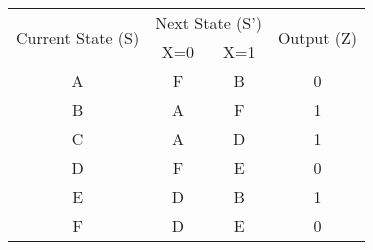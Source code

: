 \documentclass[12pt]{article}
\begin{document}
\begin{center}
    \begin{tabular}{|c|cc|c|}
        \hline
        \multirow{2}{*}{Current State (S)} & \multicolumn{2}{c|}{Next State (S')} & \multirow{2}{*}{Output (Z)}     \\ \cline{2-3}
                                           & \multicolumn{1}{c|}{X=0}             & X=1                         &   \\ \hline
        A                                  & \multicolumn{1}{c|}{F  }             & B                           & 0 \\ \hline
        B                                  & \multicolumn{1}{c|}{A  }             & F                           & 1 \\ \hline
        C                                  & \multicolumn{1}{c|}{A  }             & D                           & 1 \\ \hline
        D                                  & \multicolumn{1}{c|}{F  }             & E                           & 0 \\ \hline
        E                                  & \multicolumn{1}{c|}{D  }             & B                           & 1 \\ \hline
        F                                  & \multicolumn{1}{c|}{D  }             & E                           & 0 \\ \hline
    \end{tabular}
\end{center}
\end{document}

